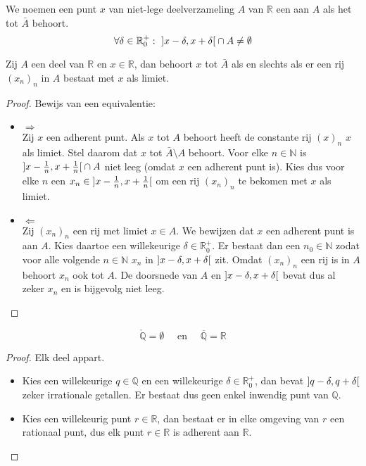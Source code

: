 \documentclass[main.tex]{subfiles}
\begin{document}
\begin{de}
  We noemen een punt $x$ van niet-lege deelverzameling $A$ van $\mathbb{R}$ een  aan $A$ als het tot $\bar{A}$ behoort.
  \[ \forall \delta \in \mathbb{R}_{0}^{+}:\ \interval[open]{x-\delta}{x+\delta} \cap A \neq \emptyset \]
\end{de}

\begin{pr}
  Zij $A$ een deel van $\mathbb{R}$ en $x\in \mathbb{R}$, dan behoort $x$ tot $\bar{A}$ als en slechts als er een rij $(x_{n})_{n}$ in $A$ bestaat met $x$ als limiet.

  \begin{proof}
    Bewijs van een equivalentie:
    \begin{itemize}
    \item $\Rightarrow$\\
      Zij $x$ een adherent punt.
      Als $x$ tot $A$ behoort heeft de constante rij $(x)_{n}$ $x$ als limiet.
      Stel daarom dat $x$ tot $\bar{A}\setminus A$ behoort.
      Voor elke $n\in \mathbb{N}$ is $\interval[open]{x-\frac{1}{n}}{x+\frac{1}{n}} \cap A$ niet leeg (omdat $x$ een adherent punt is).
      Kies dus voor elke $n$ een $x_{n} \in \interval[open]{x-\frac{1}{n}}{x+\frac{1}{n}}$ om een rij $(x_{n})_{n}$ te bekomen met $x$ als limiet.
    \item $\Leftarrow$\\
      Zij $(x_{n})_{n}$ een rij met limiet $x\in A$. We bewijzen dat $x$ een adherent punt is aan $A$.
      Kies daartoe een willekeurige $\delta \in \mathbb{R}_{0}^{+}$.
      Er bestaat dan een $n_{0}\in \mathbb{N}$ zodat voor alle volgende $n\in\mathbb{N}$ $x_{n}$ in $\interval[open]{x-\delta}{x+\delta}$ zit.
      Omdat $(x_{n})_{n}$ een rij is in $A$ behoort $x_{n}$ ook tot $A$.
      De doorsnede van $A$ en $\interval[open]{x-\delta}{x+\delta}$ bevat dus al zeker $x_{n}$ en is bijgevolg niet leeg.
    \end{itemize}
  \end{proof}
\end{pr}

\begin{pr}
  \[ \mathring{\mathbb{Q}} = \emptyset \quad\text{ en }\quad \overline{\mathbb{Q}} = \mathbb{R} \]

  \begin{proof}
    Elk deel appart.
    \begin{itemize}
    \item Kies een willekeurige $q\in \mathbb{Q}$ en een willekeurige $\delta \in \mathbb{R}_{0}^{+}$, dan bevat $\interval[open]{q-\delta}{q+\delta}$ zeker irrationale getallen.\waarom
      Er bestaat dus geen enkel inwendig punt van $\mathbb{Q}$.
    \item Kies een willekeurig punt $r \in \mathbb{R}$, dan bestaat er in elke omgeving van $r$ een rationaal punt, dus elk punt $r\in \mathbb{R}$ is adherent aan $\mathbb{R}$.
    \end{itemize}
  \end{proof}
\end{pr}
\end{document}

